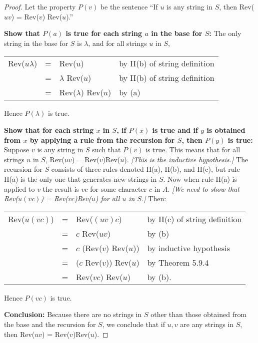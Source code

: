 \documentclass[14pt]{extarticle}
\newcommand{\cy}{\color{cyan}}
\begin{document}
\begin{proof}
    Let the property $P(v)$ be the sentence “If $u$ is any string in $S$, then Rev($uv$) = Rev($v$) Rev($u$).”

    {\bf Show that $P(a)$ is true for each string $a$ in the base for $S$:} The only string in the base for $S$ is
    $\lambda$, and for all strings $u$ in $S$,
    \begin{center}
        \begin{tabular}{rcll}
            Rev($u \lambda$) & = & Rev($u$)                & {\cy by II(b) of string definition} \\
                             & = & $\lambda$ Rev($u$)      & {\cy by II(b) of string definition} \\
                             & = & Rev($\lambda$) Rev($u$) & {\cy by (a)}
        \end{tabular}
    \end{center}
    Hence $P(\lambda)$ is true.

        {\bf Show that for each string $x$ in $S$, if $P(x)$ is true and if $y$ is obtained from $x$ by applying a rule
            from the recursion for $S$, then $P(y)$ is true:}
    Suppose $v$ is any string in $S$ such that $P(v)$ is true. This means that for all strings $u$ in $S$, Rev($uv$) =
    Rev($v$)Rev($u$). {\it [This is the inductive hypothesis.]}
    The recursion for $S$ consists of three rules denoted II(a), II(b), and II(c), but rule II(a) is the only one
    that generates new strings in $S$.
    Now when rule II(a) is applied to $v$ the result is $vc$ for some character $c$ in $A$. {\it [We need to show that
                Rev($u(vc)$) = Rev($vc$)Rev($u$) for all $u$ in $S$.]} Then:
    \begin{center}
        \begin{tabular}{rcll}
            Rev($u(vc)$) & = & Rev($(uv)c$)            & {\cy by II(c) of string definition} \\
                         & = & $c$ Rev($uv$)           & {\cy by (b)}                        \\
                         & = & $c$ (Rev($v$) Rev($u$)) & {\cy by inductive hypothesis}       \\
                         & = & ($c$ Rev($v$)) Rev($u$) & {\cy by Theorem 5.9.4}              \\
                         & = & Rev($vc$) Rev($u$)      & {\cy by (b).}
        \end{tabular}
    \end{center}
    Hence $P(vc)$ is true.

        {\bf Conclusion:} Because there are no strings in $S$ other than those obtained from the base and the recursion for
    $S$, we conclude that if $u, v$ are any strings in $S$, then Rev($uv$) = Rev($v$)Rev($u$).
\end{proof}
\end{document}
